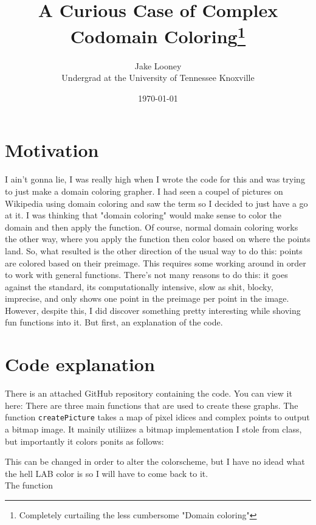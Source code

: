 \documentclass[a4paper,12pt]{article}
\begin{document}
\title{A Curious Case of Complex Codomain Coloring\thanks{Completely curtailing the less cumbersome "Domain coloring"}}
\author{Jake Looney\\ Undergrad at the University of Tennessee Knoxville}
\date{\today}
\maketitle

\tableofcontents
\newpage
{}

\section{Motivation}
I ain't gonna lie, I was really high when I wrote the code for this and was trying to just make a domain coloring grapher.
I had seen a coupel of pictures on Wikipedia using domain coloring and saw the term so I decided to just have a go at it.
I was thinking that "domain coloring" would make sense to color the domain and then apply the function.
Of course, normal domain coloring works the other way, where you apply the function then color based on where the points land.
So, what resulted is the other direction of the usual way to do this: points are colored based on their preimage.
This requires some working around in order to work with general functions.
There's not many reasons to do this: it goes against the standard, its computationally intensive, slow as shit, blocky, imprecise, and only shows one point in the preimage per point in the image.
However, despite this, I did discover something pretty interesting while shoving fun functions into it. But first, an explanation of the code.

\section{Code explanation}
There is an attached GitHub repository containing the code. You can view it here:
There are three main functions that are used to create these graphs. The function \verb|createPicture| takes a map of pixel idices and complex points to output a bitmap image. It mainily utiliizes a bitmap implementation I stole from class, but importantly it colors ponits as follows:

This can be changed in order to alter the colorscheme, but I have no idead what the hell LAB color is so I will have to come back to it.\\
The function 
\end{document}
